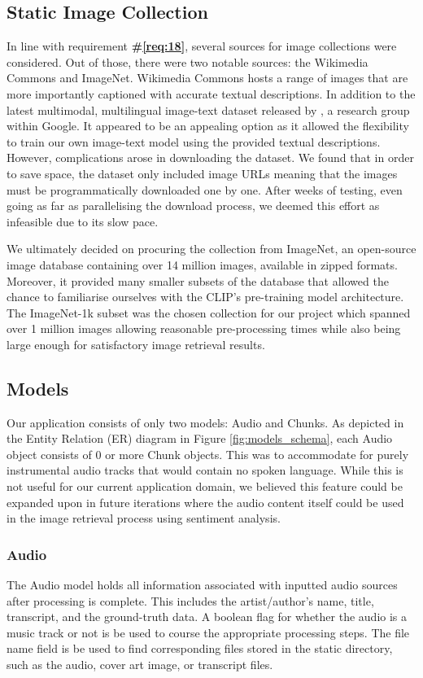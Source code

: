 \documentclass{l4proj}
\begin{document}
\subsection{Static Image Collection}
In line with requirement \textbf{\#\ref{req:18}}, several sources for image collections were considered. Out of those, there were two notable sources: the Wikimedia Commons and ImageNet. Wikimedia Commons hosts a range of images that are more importantly captioned with accurate textual descriptions. In addition to the latest multimodal, multilingual image-text dataset released by \cite{srinivasan2021wit}, a research group within Google. It appeared to be an appealing option as it allowed the flexibility to train our own image-text model using the provided textual descriptions. However, complications arose in downloading the dataset. We found that in order to save space, the dataset only included image URLs meaning that the images must be programmatically downloaded one by one. After weeks of testing, even going as far as parallelising the download process, we deemed this effort as infeasible due to its slow pace. 

We ultimately decided on procuring the collection from ImageNet, an open-source image database containing over 14 million images, available in zipped formats. Moreover, it provided many smaller subsets of the database that allowed the chance to familiarise ourselves with the CLIP's pre-training model architecture. The ImageNet-1k subset was the chosen collection for our project which spanned over 1 million images allowing reasonable pre-processing times while also being large enough for satisfactory image retrieval results.


\subsection{Models}
Our application consists of only two models: Audio and Chunks. As depicted in the Entity Relation (ER) diagram in Figure \ref{fig:models_schema}, each Audio object consists of 0 or more Chunk objects. This was to accommodate for purely instrumental audio tracks that would contain no spoken language. While this is not useful for our current application domain, we believed this feature could be expanded upon in future iterations where the audio content itself could be used in the image retrieval process using sentiment analysis.

\subsubsection{Audio}
The Audio model holds all information associated with inputted audio sources after processing is complete. This includes the artist/author's name, title, transcript, and the ground-truth data. A boolean flag for whether the audio is a music track or not is be used to course the appropriate processing steps. The file name field is be used to find corresponding files stored in the static directory, such as the audio, cover art image, or transcript files. 
\end{document}
